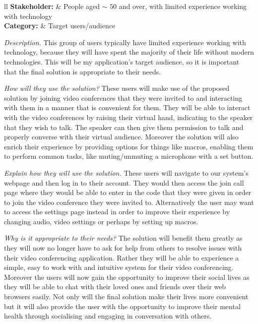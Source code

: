 \noindent
\begin{tblr}{ll}
  \textsf{\bfseries Stakeholder: } & {People aged $\sim$
  \hspace{-0.2cm} $50$ and over, with limited experience
  working with technology}\\
  \textsf{\bfseries Category: } & Target users/audience\\
\end{tblr}
\vspace{0.2cm}

\textit{Description.}
This group of users typically have limited experience working
with technology, because they will have spent the majority of
their life without modern technologies. This will be my
application's target audience, so it is important that the
final solution is appropriate to their needs. \vspace{0.2cm}

\textit{How will they use the solution?}
These users will make use of the proposed solution by joining
video conferences that they were invited to and interacting with
them in a manner that is convenient for them. They will be
able to interact with the video conferences by raising their
virtual hand, indicating to the speaker that they wish to talk.
The speaker can then give them permission to talk and properly
converse with their virtual audience. Moreover the solution
will also enrich their experience by providing options for
things like macros, enabling them to perform common tasks,
like muting/unmuting a microphone with a set button.
\vspace{0.2cm}

\textit{Explain how they will use the solution.}
These users will navigate to our system's webpage and then
log in to their account. They would then access the join call
page where they would be able to enter in the code that they
were given in order to join the video conference they were invited
to. Alternatively the user may want to access the settings page
instead in order to improve their experience by changing audio,
video settings or perhaps by setting up macros.
\vspace{0.2cm}

\textit{Why is it appropriate to their needs?}
The solution will benefit them greatly as they will now no
longer have to ask for help from others to resolve issues with
their video conferencing application. Rather they will be able
to experience a simple, easy to work with and intuitive system
for their video conferencing. Moreover the users will now gain
the opportunity to improve their social lives as they will be
able to chat with their loved ones and friends over their web
browsers easily. Not only will the final solution make their
lives more convenient but it will also provide the user with
the opportunity to improve their mental health through
socialising and engaging in conversation with others.
\cite{social}
\vspace{0.2cm}

